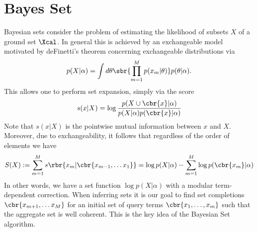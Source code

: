 \documentclass{article}
\begin{document}
\newpage
\section{Bayes Set \cite{ghahramani2005bayesian}}
\label{app:bs}
Bayesian sets consider the problem of estimating the likelihood of subsets $X$ of a ground set $\Xcal$. In general this is achieved by an exchangeable model motivated by deFinetti's theorem concerning exchangeable distributions via 
\begin{align}
  \label{eq:definetti-app}
  p(X|\alpha) = \int d\theta \sbr{\prod_{m=1}^M p(x_m|\theta)} p(\theta|\alpha). 
\end{align}
This allows one to perform set expansion, simply via the score
\begin{align}
  \label{eq:score}
  s(x|X) = \log \frac{p(X \cup \cbr{x}|\alpha)}{p(X|\alpha) p(\cbr{x}|\alpha)}
\end{align}
Note that $s(x|X)$ is the pointwise mutual information between $x$ and $X$. Moreover, due to exchangeability, it follows that regardless of the order of elements we have 
\begin{align}
  \label{eq:setscore-app}
  S(X) := \sum_{m=1}^M s\rbr{x_m|\cbr{x_{m-1}, \ldots x_1}} = \log
  p(X|\alpha) - \sum_{m=1}^M \log p(\cbr{x_m}|\alpha)
\end{align}
In other words, we have a set function $\log p(X|\alpha)$ with a modular term-dependent correction. When inferring sets it is our goal to find set completions $\cbr{x_{m+1}, \ldots x_M}$ for an initial set of query terms $\cbr{x_1, \ldots, x_m}$ such that the aggregate set is well coherent. This is the key idea of the Bayesian Set algorithm. 
\end{document}

